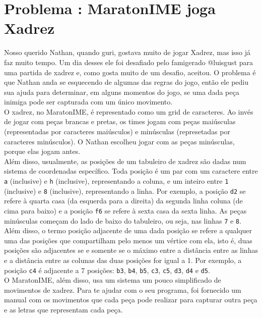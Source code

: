 \section*{Problema \proxLetra: MaratonIME joga Xadrez}

Nosso querido Nathan, quando guri, gostava muito de jogar Xadrez, mas isso já faz muito tempo. Um dia desses ele foi desafiado pelo famigerado @luisgust para uma partida de xadrez e, como gosta muito de um desafio, aceitou. O problema é que Nathan anda se esquecendo de algumas das regras do jogo, então ele pediu sua ajuda para determinar, em alguns momentos do jogo, se uma dada peça inimiga pode ser capturada com um único movimento. \\
O xadrez, no MaratonIME, é representado como um grid de caracteres. Ao invés de jogar com peças brancas e pretas, os times jogam com peças maiúsculas (representadas por caracteres maiúsculos) e minúsculas (represetadas por caracteres minúsculos). O Nathan escolheu jogar com as peças minúsculas, porque elas jogam antes. \\
Além disso, usualmente, as posições de um tabuleiro de xadrez são dadas num sistema de coordenadas específico. Toda posição é um par com um caractere entre \texttt{a} (inclusive) e \texttt{h} (inclusive), representando a coluna, e um inteiro entre \texttt{1} (inclusive) e \texttt{8} (inclusive), representando a linha. Por exemplo, a posição \texttt{d2} se refere à quarta casa (da esquerda para a direita) da segunda linha coluna (de cima para baixo) e a posição \texttt{f6} se refere à sexta casa da sexta linha. As peças minúsculas começam do lado de baixo do tabuleiro, ou seja, nas linhas \texttt{7} e \texttt{8}. \\
Além disso, o termo posição adjacente de uma dada posição se refere a qualquer uma das posições que compartilham pelo menos um vértice com ela, isto é, duas posições são adjacentes se e somente se o máximo entre a distância entre as linhas e a distância entre as colunas das duas posições for igual a 1. Por exemplo, a posição \texttt{c4} é adjacente a 7 posições: \texttt{b3}, \texttt{b4}, \texttt{b5}, \texttt{c3}, \texttt{c5}, \texttt{d3}, \texttt{d4} e \texttt{d5}. \\
O MaratonIME, além disso, usa um sistema um pouco simplificado de movimentos de xadrez. Para te ajudar com o seu programa, foi fornecido um manual com os movimentos que cada peça pode realizar para capturar outra peça e as letras que representam cada peça. \\
